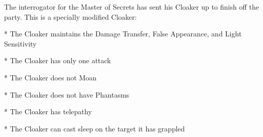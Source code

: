 The interrogator for the Master of Secrets has sent his Cloaker up to finish off the party.
This is a specially modified Cloaker:

* The Cloaker maintains the Damage Transfer, False Appearance, and Light Sensitivity

* The Cloaker has only one attack

* The Cloaker does not Moan

* The Cloaker does not have Phantasms

* The Cloaker has telepathy

* The Cloaker can cast sleep on the target it has grappled

